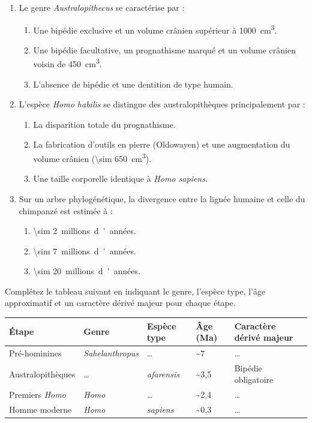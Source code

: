 \documentclass[11pt]{article}
\begin{document}
\begin{exercice}
\begin{enumerate}
    \item Le genre \textit{Australopithecus} se caractérise par :
    \begin{enumerate}
        \item Une bipédie exclusive et un volume crânien supérieur à \SI{1000}{cm^3}.
        \item Une bipédie facultative, un prognathisme marqué et un volume crânien voisin de \SI{450}{cm^3}.
        \item L'absence de bipédie et une dentition de type humain.
    \end{enumerate}
    \item L'espèce \textit{Homo habilis} se distingue des australopithèques principalement par :
    \begin{enumerate}
        \item La disparition totale du prognathisme.
        \item La fabrication d'outils en pierre (Oldowayen) et une augmentation du volume crânien (\SI{\sim 650}{cm^3}).
        \item Une taille corporelle identique à \textit{Homo sapiens}.
    \end{enumerate}
    \item Sur un arbre phylogénétique, la divergence entre la lignée humaine et celle du chimpanzé est estimée à :
    \begin{enumerate}
        \item \SI{\sim 2}{millions d'années}.
        \item \SI{\sim 7}{millions d'années}.
        \item \SI{\sim 20}{millions d'années}.
    \end{enumerate}
\end{enumerate}
\end{exercice}

\begin{exercice}
Complétez le tableau suivant en indiquant le genre, l'espèce type, l'âge approximatif et un caractère dérivé majeur pour chaque étape.

\begin{tabularx}{\linewidth}{|>{\centering\arraybackslash}X|>{\centering\arraybackslash}X|>{\centering\arraybackslash}X|>{\centering\arraybackslash}X|>{\centering\arraybackslash}X|}
\hline
\textbf{Étape} & \bfseries Genre & \bfseries Espèce type & \bfseries Âge (Ma) & \bfseries Caractère dérivé majeur \\ \hline
Pré-hominines & \textit{Sahelanthropus} & \dots & \sim 7 & \dots \\ \hline
Australopithèques & \dots & \textit{afarensis} & \sim 3,5 & Bipédie obligatoire \\ \hline
Premiers \textit{Homo} & \textit{Homo} & \dots & \sim 2,4 & \dots \\ \hline
Homme moderne & \textit{Homo} & \textit{sapiens} & \sim 0,3 & \dots \\ \hline
\end{tabularx}
\end{exercice}
\end{document}
